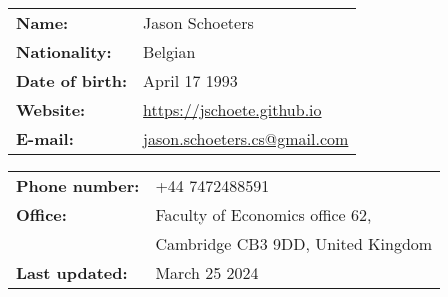 \documentclass[french]{resume} %
\begin{document}
	
	\begin{minipage}[t]{0.49\textwidth}
		\begin{tabular}{ m{7em} m{15em} }
			\textbf{Name:} & Jason Schoeters\\
			\textbf{Nationality:} & Belgian\\
			\textbf{Date of birth:} & April 17 1993\\
			\textbf{Website:} & \url{https://jschoete.github.io}\\
			\textbf{E-mail: } & \href{mailto:jason.schoeters.cs@gmail.com}{jason.schoeters.cs@gmail.com}\\
		\end{tabular}
	\end{minipage} 
	\begin{minipage}[t]{0.49\textwidth}
		\begin{tabular}{ m{8em} m{20em} }
			\textbf{Phone number: } & +44 7472488591\\
			\textbf{Office:} & Faculty of Economics office 62,\\
			&Cambridge CB3 9DD, \newline United Kingdom\\
			\textbf{Last updated:} & March 25 2024
		\end{tabular}
	\end{minipage} 
	
\end{document}
